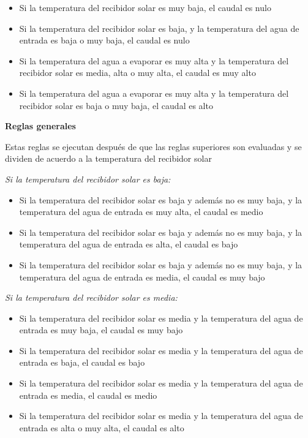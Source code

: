 			\begin{itemize}
				\item Si la temperatura del recibidor solar es muy baja, el caudal es nulo
				\item Si la temperatura del recibidor solar es baja, y la temperatura del agua de entrada es baja o muy baja, el caudal es nulo
				\item Si la temperatura del agua a evaporar es muy alta y la temperatura del recibidor solar es media, alta o muy alta, el caudal es muy alto
				\item Si la temperatura del agua a evaporar es muy alta y la temperatura del recibidor solar es baja o muy baja, el caudal es alto
			\end{itemize}
			
			\textbf{Reglas generales}\par
			
			Estas reglas se ejecutan después de que las reglas superiores son evaluadas y se dividen de acuerdo a la temperatura del recibidor solar
			
			\textit{Si la temperatura del recibidor solar es baja:}\par
			\begin{itemize}
				\item Si la temperatura del recibidor solar es baja y además no es muy baja, y la temperatura del agua de entrada es muy alta, el caudal es medio
				\item Si la temperatura del recibidor solar es baja y además no es muy baja, y la temperatura del agua de entrada es alta, el caudal es bajo
				\item Si la temperatura del recibidor solar es baja y además no es muy baja, y la temperatura del agua de entrada es media, el caudal es muy bajo
			\end{itemize}
			
			\textit{Si la temperatura del recibidor solar es media:}\par
			\begin{itemize}
				\item Si la temperatura del recibidor solar es media y la temperatura del agua de entrada es muy baja, el caudal es muy bajo
				\item Si la temperatura del recibidor solar es media y la temperatura del agua de entrada es baja, el caudal es bajo
				\item Si la temperatura del recibidor solar es media y la temperatura del agua de entrada es media, el caudal es medio
				\item Si la temperatura del recibidor solar es media y la temperatura del agua de entrada es alta o muy alta, el caudal es alto
			\end{itemize}
			
